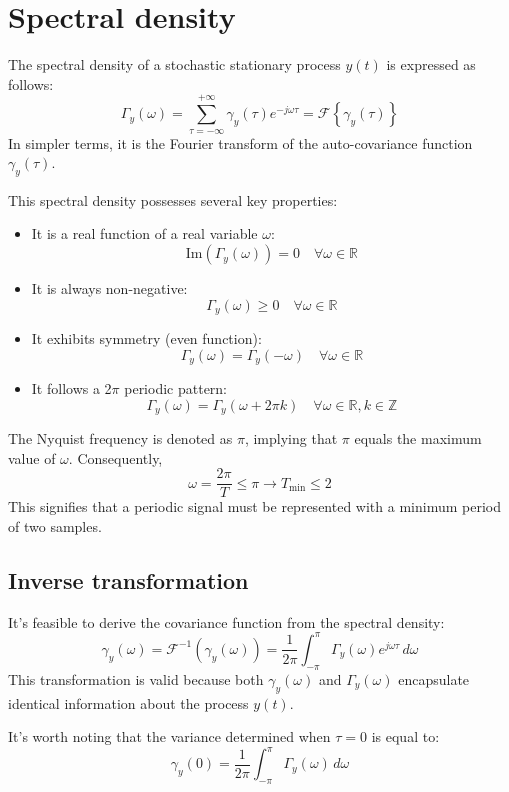 \section{Spectral density}

The spectral density of a stochastic stationary process $y(t)$ is expressed as follows:
\[\Gamma_y(\omega)=\sum_{\tau=-\infty}^{+\infty}\gamma_y(\tau)e^{-j\omega\tau}=\mathcal{F}\left\{ \gamma_y(\tau) \right\}\]
In simpler terms, it is the Fourier transform of the auto-covariance function $\gamma_y(\tau)$.

This spectral density possesses several key properties:
\begin{itemize}
    \item It is a real function of a real variable $\omega$:
        \[\text{Im}(\Gamma_y(\omega))=0\quad\forall\omega\in\mathbb{R}\]
    \item It is always non-negative:
        \[\Gamma_y(\omega) \geq 0\quad\forall\omega\in\mathbb{R}\]
    \item It exhibits symmetry (even function):
        \[\Gamma_y(\omega)=\Gamma_y(-\omega)\quad\forall\omega\in\mathbb{R}\] 
    \item It follows a 2$\pi$ periodic pattern: 
        \[\Gamma_y(\omega)=\Gamma_y(\omega+2\pi k)\quad\forall\omega\in\mathbb{R},k\in\mathbb{Z}\]
\end{itemize}
The Nyquist frequency is denoted as $\pi$, implying that $\pi$ equals the maximum value of $\omega$. 
Consequently,
\[\omega=\dfrac{2\pi}{T} \leq \pi \rightarrow T_{\min}\leq 2\]
This signifies that a periodic signal must be represented with a minimum period of two samples.

\subsection{Inverse transformation}
It's feasible to derive the covariance function from the spectral density:
\[\gamma_y(\omega)=\mathcal{F}^{-1}\left(\gamma_y(\omega)\right)=\dfrac{1}{2\pi}\int_{-\pi}^{\pi}\Gamma_y(\omega)e^{j\omega\tau}\,d\omega\]
This transformation is valid because both $\gamma_y(\omega)$ and $\Gamma_y(\omega)$ encapsulate identical information about the process $y(t)$.

It's worth noting that the variance determined when $\tau=0$ is equal to:
\[\gamma_y(0)=\dfrac{1}{2\pi}\int_{-\pi}^{\pi}\Gamma_y(\omega)\,d\omega\]